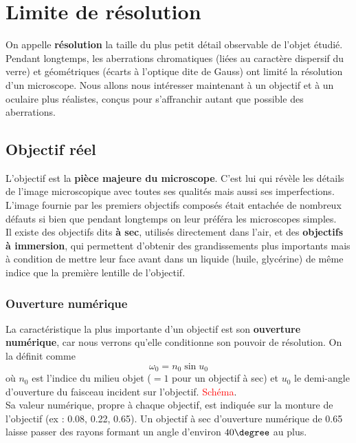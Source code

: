 \documentclass[11pt,a4paper]{report}
\begin{document}
\newpage
\section{Limite de résolution}

On appelle \textbf{résolution} la taille du plus petit détail observable de l'objet étudié. Pendant longtemps, les aberrations chromatiques (liées au caractère dispersif du verre) et géométriques (écarts à l'optique dite de Gauss) ont limité la résolution d'un microscope. Nous allons nous intéresser maintenant à un objectif et à un oculaire plus réalistes, conçus pour s'affranchir autant que possible des aberrations.

\subsection{Objectif réel}

L'objectif est la \textbf{pièce majeure du microscope}. C'est lui qui révèle les détails de l'image microscopique avec toutes ses qualités mais aussi ses imperfections. L'image fournie par les premiers objectifs composés était entachée de nombreux défauts si bien que pendant longtemps on leur préféra les microscopes simples.\\

Il existe des objectifs dits \textbf{à sec}, utilisés directement dans l'air, et des \textbf{objectifs à immersion}, qui permettent d'obtenir des grandissements plus importants mais à condition de mettre leur face avant dans un liquide (huile, glycérine) de même indice que la première lentille de l'objectif.

\subsubsection{Ouverture numérique}

La caractéristique la plus importante d'un objectif est son \textbf{ouverture numérique}, car nous verrons qu'elle conditionne son pouvoir de résolution. On la définit comme
\begin{equation}
	\boxed{\omega_0 = n_0\;\text{sin}\;u_0} 
\end{equation}
où $n_0$ est l'indice du milieu objet ($= 1$ pour un objectif à sec) et $u_0$ le demi-angle d'ouverture du faisceau incident sur l'objectif. \textcolor{red}{Schéma}.\\

Sa valeur numérique, propre à chaque objectif, est indiquée sur la monture de l'objectif (ex : 0.08, 0.22, 0.65). Un objectif à sec d'ouverture numérique de 0.65 laisse passer des rayons formant un angle d'environ $40\degree$ au plus.\\
\end{document}
